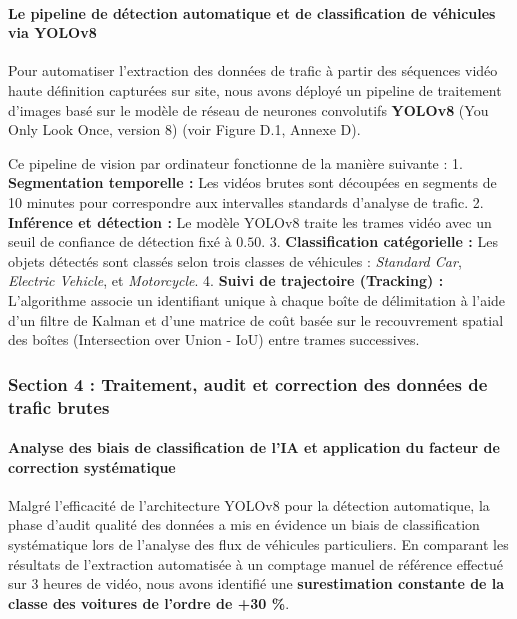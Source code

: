 \documentclass[10pt, a4paper]{article}
\begin{document}
\paragraph{Le pipeline de détection automatique et de classification de
véhicules via
YOLOv8}\label{le-pipeline-de-duxe9tection-automatique-et-de-classification-de-vuxe9hicules-via-yolov8}

Pour automatiser l'extraction des données de trafic à partir des
séquences vidéo haute définition capturées sur site, nous avons déployé
un pipeline de traitement d'images basé sur le modèle de réseau de
neurones convolutifs \textbf{YOLOv8} (You Only Look Once, version 8)
(voir Figure D.1, Annexe D).

Ce pipeline de vision par ordinateur fonctionne de la manière suivante :
1. \textbf{Segmentation temporelle :} Les vidéos brutes sont découpées
en segments de 10 minutes pour correspondre aux intervalles standards
d'analyse de trafic. 2. \textbf{Inférence et détection :} Le modèle
YOLOv8 traite les trames vidéo avec un seuil de confiance de détection
fixé à \(0.50\). 3. \textbf{Classification catégorielle :} Les objets
détectés sont classés selon trois classes de véhicules : \emph{Standard
Car}, \emph{Electric Vehicle}, et \emph{Motorcycle}. 4. \textbf{Suivi de
trajectoire (Tracking) :} L'algorithme associe un identifiant unique à
chaque boîte de délimitation à l'aide d'un filtre de Kalman et d'une
matrice de coût basée sur le recouvrement spatial des boîtes
(Intersection over Union - IoU) entre trames successives.

\newpage

\subsubsection{Section 4 : Traitement, audit et correction des données
de trafic
brutes}\label{section-4-traitement-audit-et-correction-des-donnuxe9es-de-trafic-brutes}

\paragraph{Analyse des biais de classification de l'IA et application du
facteur de correction
systématique}\label{analyse-des-biais-de-classification-de-lia-et-application-du-facteur-de-correction-systuxe9matique}

Malgré l'efficacité de l'architecture YOLOv8 pour la détection
automatique, la phase d'audit qualité des données a mis en évidence un
biais de classification systématique lors de l'analyse des flux de
véhicules particuliers. En comparant les résultats de l'extraction
automatisée à un comptage manuel de référence effectué sur 3 heures de
vidéo, nous avons identifié une \textbf{surestimation constante de la
classe des voitures de l'ordre de +30 \%}.
\end{document}
